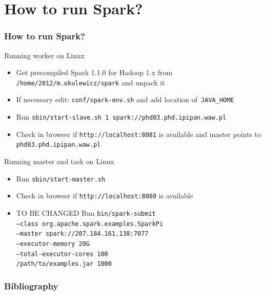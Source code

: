 \documentclass{beamer}
\begin{document}
\section{How to run Spark?}
\begin{frame}[allowframebreaks]
\frametitle{How to run Spark?}
\begin{block}{Running worker on Linux}
	\begin{itemize}
		\item Get precompiled Spark 1.1.0 for Hadoop 1.x from \texttt{/home/2012/m.okulewicz/spark} and unpack it
		\item If necessary edit: \texttt{conf/spark-env.sh} and add location of~\texttt{JAVA\_HOME}
		\item Run \texttt{sbin/start-slave.sh 1 spark://phd03.phd.ipipan.waw.pl}
		\item Check in browser if \texttt{http://localhost:8081} is available and master points to \texttt{phd03.phd.ipipan.waw.pl}
	\end{itemize}
	\end{block}
	\begin{block}{Running master and task on Linux}
	\begin{itemize}
		\item Run \texttt{sbin/start-master.sh}
		\item Check in browser if \texttt{http://localhost:8080} is available
		\item \color{red}TO BE CHANGED Run \texttt{bin/spark-submit \\
  --class org.apache.spark.examples.SparkPi \\
  --master spark://207.184.161.138:7077 \\
  --executor-memory 20G \\
  --total-executor-cores 100 \\
  /path/to/examples.jar 1000}
	\end{itemize}
	\end{block}

\end{frame}

\begin{frame}[allowframebreaks]
	\frametitle<presentation>{Bibliography}
	\nocite{*}
	
	\tiny
	
\end{frame}
\end{document}

